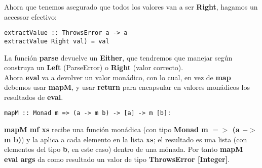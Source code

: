 Ahora que tenemos asegurado que todos los valores van a ser \textbf{Right}, hagamos un accessor
efectivo:\\

\begin{minipage}{\linewidth}
\begin{small}
\begin{lstlisting}[frame=single]
extractValue :: ThrowsError a -> a
extractValue Right val) = val
\end{lstlisting}
\end{small}
\end{minipage}

La funci\'on \textbf{parse} devuelve un \textbf{Either}, que tendremos que manejar seg\'un construya un \textbf{Left} (ParseError) o \textbf{Right} (valor correcto).\\

Ahora \textbf{eval} va a devolver un valor mon\'adico, con lo cual, en vez de \textbf{map} debemos usar \textbf{mapM}, y usar \textbf{return} para encapsular en valores mon\'adicos los resultados de \textbf{eval}.\\

\begin{minipage}{\linewidth}
\begin{small}
\begin{lstlisting}[frame=single]
mapM :: Monad m => (a -> m b) -> [a] -> m [b]:
\end{lstlisting}
\end{small}
\end{minipage}

\textbf{mapM mf xs} recibe una funci\'on mon\'adica (con tipo \textbf{Monad m $=\!>$ (a $-\!>$ m b)}) y la aplica a cada elemento en la lista \textbf{xs}; el resultado es una lista (con elementos del tipo \textbf{b}, en este caso) dentro de una m\'onada. Por tanto \textbf{mapM eval args} da como resultado un valor de tipo \textbf{ThrowsError [Integer]}.\\

